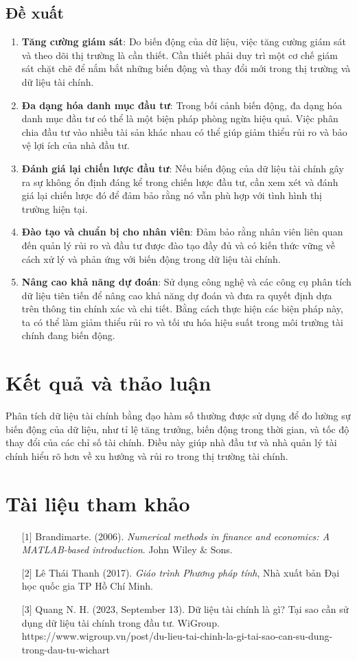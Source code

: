 \documentclass[12pt,a4paper]{report}
\begin{document}
\subsection*{Đề xuất}
\begin{enumerate}
    \item \textbf{Tăng cường giám sát}: Do biến động của dữ liệu, việc tăng cường giám sát và theo dõi thị trường là cần thiết. Cần thiết phải duy trì một cơ chế giám sát chặt chẽ để nắm bắt những biến động và thay đổi mới trong thị trường và dữ liệu tài chính.
    \item \textbf{Đa dạng hóa danh mục đầu tư}: Trong bối cảnh biến động, đa dạng hóa danh mục đầu tư có thể là một biện pháp phòng ngừa hiệu quả. Việc phân chia đầu tư vào nhiều tài sản khác nhau có thể giúp giảm thiểu rủi ro và bảo vệ lợi ích của nhà đầu tư.
    \item \textbf{Đánh giá lại chiến lược đầu tư}: Nếu biến động của dữ liệu tài chính gây ra sự không ổn định đáng kể trong chiến lược đầu tư, cần xem xét và đánh giá lại chiến lược đó để đảm bảo rằng nó vẫn phù hợp với tình hình thị trường hiện tại.
    \item \textbf{Đào tạo và chuẩn bị cho nhân viên}: Đảm bảo rằng nhân viên liên quan đến quản lý rủi ro và đầu tư được đào tạo đầy đủ và có kiến thức vững về cách xử lý và phản ứng với biến động trong dữ liệu tài chính.
    \item \textbf{Nâng cao khả năng dự đoán}: Sử dụng công nghệ và các công cụ phân tích dữ liệu tiên tiến để nâng cao khả năng dự đoán và đưa ra quyết định dựa trên thông tin chính xác và chi tiết. Bằng cách thực hiện các biện pháp này, ta có thể làm giảm thiểu rủi ro và tối ưu hóa hiệu suất trong môi trường tài chính đang biến động.    
\end{enumerate}
\section{Kết quả và thảo luận}
Phân tích dữ liệu tài chính bằng đạo hàm số thường được sử dụng để đo lường sự biến động của dữ liệu, như tỉ lệ tăng trưởng, biến động trong thời gian, và tốc độ thay đổi của các chỉ số tài chính. Điều này giúp nhà đầu tư và nhà quản lý tài chính hiểu rõ hơn về xu hướng và rủi ro trong thị trường tài chính.
\newpage
\section{Tài liệu tham khảo}
\begin{itemize}
    \item[$\lbrack1\rbrack$] Brandimarte. (2006). \textit{Numerical methods in finance and economics: A MATLAB-based introduction}. John Wiley $\&$ Sons.
    \item[$\lbrack2\rbrack$] Lê Thái Thanh (2017). \textit{Giáo trình Phương pháp tính}, Nhà xuất bản Đại học quốc gia TP Hồ Chí Minh.
    \item[$\lbrack3\rbrack$] Quang N. H. (2023, September 13). Dữ liệu tài chính là gì? Tại sao cần sử dụng dữ liệu tài chính trong đầu tư. WiGroup. https://www.wigroup.vn/post/du-lieu-tai-chinh-la-gi-tai-sao-can-su-dung-trong-dau-tu-wichart
\end{itemize}
\end{document}
